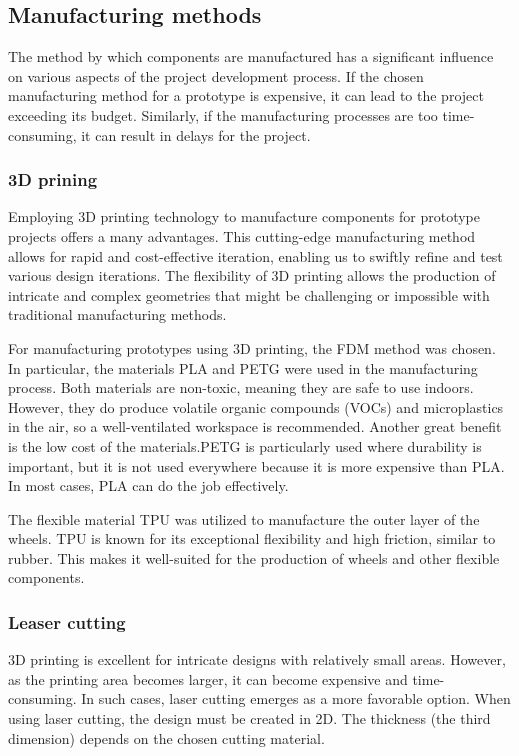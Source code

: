 \documentclass[../report.tex]{subfiles}
\begin{document}
\subsection{Manufacturing methods}
    The method by which components are manufactured has a significant influence
    on various aspects of the project development process. If the chosen
    manufacturing method for a prototype is expensive, it can lead to the
    project exceeding its budget. Similarly, if the manufacturing processes are
    too time-consuming, it can result in delays for the project.
\subsubsection{3D prining}
    Employing 3D printing technology to manufacture components for prototype
    projects offers a many advantages. This cutting-edge manufacturing method
    allows for rapid and cost-effective iteration, enabling us to swiftly refine
    and test various design iterations. The flexibility of 3D printing allows the
    production of intricate and complex geometries that might be challenging or
    impossible with traditional manufacturing methods.

    For manufacturing prototypes using 3D printing, the FDM method was chosen.
    In particular, the materials PLA and PETG were used in the manufacturing
    process. Both materials are non-toxic, meaning they are safe to use
    indoors. However, they do produce volatile organic compounds (VOCs) and
    microplastics in the air, so a well-ventilated workspace is recommended.
    Another great benefit is the low cost of the materials.PETG is particularly
    used where durability is important, but it is not used everywhere because
    it is more expensive than PLA. In most cases, PLA can do the job
    effectively.

    The flexible material TPU was utilized to manufacture the outer layer of
    the wheels. TPU is known for its exceptional flexibility and high friction,
    similar to rubber. This makes it well-suited for the production of wheels
    and other flexible components.
\subsubsection{Leaser cutting}
    3D printing is excellent for intricate designs with relatively small areas.
    However, as the printing area becomes larger, it can become expensive and
    time-consuming. In such cases, laser cutting emerges as a more favorable
    option. When using laser cutting, the design must be created in 2D. The
    thickness (the third dimension) depends on the chosen cutting material.
\end{document}
